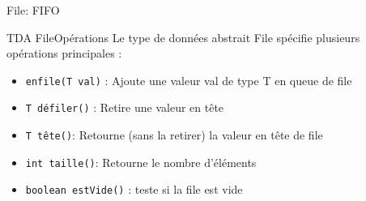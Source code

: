 \documentclass[12pt,a4paper]{beamer}
\begin{document}
\begin{frame}{File: FIFO}


\end{frame}

\begin{frame}{TDA File}{Opérations}
Le type de données abstrait File spécifie plusieurs opérations principales :
\begin{itemize}
\item \texttt{enfile(T val)} : Ajoute une valeur val de type T en queue de file
\item \texttt{T défiler()} : Retire une valeur en tête
\item \texttt{T tête()}: Retourne (sans la retirer) la valeur en tête de file
\item \texttt{int taille()}: Retourne le nombre d'éléments
\item \texttt{boolean estVide()} : teste si la file est vide
\end{itemize}

\end{frame}
\end{document}
